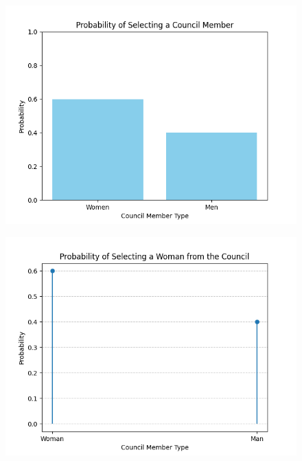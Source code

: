 \documentclass[journal]{IEEEtran}
\begin{document}
\begin{figure}[h!]
   \centering
   \includegraphics[width=\columnwidth]{figs/fig1.png}
   \end{figure}
\begin{figure}[h!]
   \centering
   \includegraphics[width=\columnwidth]{figs/fig2.png}
   \end{figure}
\end{document}
